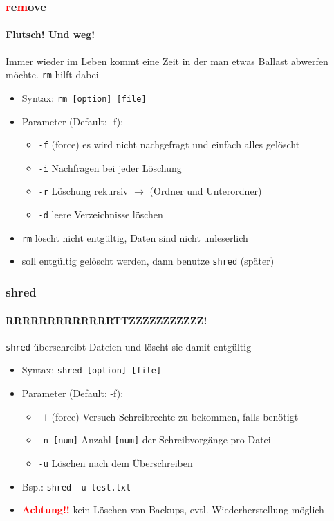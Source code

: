 \documentclass[12pt,utf8]{beamer}
\begin{document}
\begin{frame}
\frametitle{\textcolor{red}{r}e\textcolor{red}{m}ove}
\framesubtitle{\textcolor{ownDarkOr}{Flutsch! Und weg!}}
Immer wieder im Leben kommt eine Zeit in der man etwas Ballast abwerfen möchte.  
\texttt{rm} hilft dabei
\begin{itemize}
	\item Syntax: \texttt{rm [option] [file]}
	\item Parameter (Default: -f):
	\begin{itemize}[<+->]
		\item \texttt{-f} (force) es wird nicht nachgefragt und einfach alles gelöscht
		\item \texttt{-i} Nachfragen bei jeder Löschung
		\item \texttt{-r} Löschung rekursiv $\to$ (Ordner und Unterordner)
		\item \texttt{-d} leere Verzeichnisse löschen
	\end{itemize}
	\item \texttt{rm} löscht nicht entgültig, Daten sind nicht unleserlich
	\item soll entgültig gelöscht werden, dann benutze \texttt{shred} (später)
\end{itemize}
\end{frame}

\begin{frame}
\frametitle{shred}
\framesubtitle{\textcolor{ownDarkOr}{RRRRRRRRRRRRRTTZZZZZZZZZZZ!}}
\texttt{shred} überschreibt Dateien und löscht sie damit entgültig
\begin{itemize}
	\item Syntax: \texttt{shred [option] [file]}
	\item Parameter (Default: -f):
	\begin{itemize}[<+->]
		\item \texttt{-f} (force) Versuch Schreibrechte zu bekommen, falls benötigt
		\item \texttt{-n [num]} Anzahl \texttt{[num]} der Schreibvorgänge pro Datei
		\item \texttt{-u} Löschen nach dem Überschreiben
	\end{itemize}
	\item Bsp.: \texttt{shred -u test.txt}
	\item \textbf{\textcolor{red}{Achtung!!}} kein Löschen von Backups, evtl. Wiederherstellung möglich
\end{itemize}
\end{frame}
\end{document}
